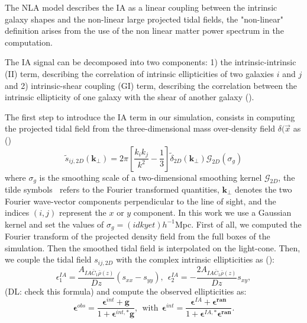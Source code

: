 \documentclass[twocolumn,twocolappendix]{aastex63}
\newcommand{\denise}[1]{{\color{red}DL: #1}}
\begin{document}
The NLA model describes the IA as a linear coupling between the intrinsic galaxy shapes and the non-linear large projected tidal fields, the "non-linear" definition arises from the use of the non linear matter power spectrum in the computation. 

The IA signal can be decomposed into two components: 1) the intrinsic-intrinsic (II) term, describing the correlation of intrinsic ellipticities of two galaxies $i$ and $j$ and 2) intrinsic-shear coupling (GI) term, describing the correlation between the intrinsic ellipticity of one galaxy with the shear of another galaxy (\cite{kilbinger2015cosmology}).

The first step to introduce the IA term in our simulation, consists in computing the projected tidal field from the three-dimensional mass over-density field $\delta(\vec{x}$
as (\cite{harnois2021cosmic})
\begin{equation}
   \tilde{s}_{ij,2D}(\textbf{k}_{\bot})=
   2 \pi 	\left [ \frac{k_ik_j}{k^2}- \frac{1}{3} \right ]
   \tilde{\delta}_{2D}(\textbf{k}_{\bot})
   \mathcal{G}_{2D}(\sigma_g)
\end{equation}
where $\sigma_g$ is the smoothing scale of a two-dimensional smoothing kernel $\mathcal{G}_{2D}$, the tilde symbols $~$ refers to the Fourier transformed quantities, $\textbf{k}_{\bot}$ denotes the two Fourier wave-vector components perpendicular to the line of sight, and the indices $(i,j)$ represent the $x$ or $y$ component.
In this work we use a Gaussian kernel and set the values of $\sigma_g=(idk yet) h^{-1}$Mpc.
First of all, we computed the Fourier transform of the projected density field from the full boxes of the simulation. 
Then the smoothed tidal field is interpolated on the light-cone. 
Then, we couple the tidal field $s_{ij,2D}$ with the complex intrinsic ellipticities as (\cite{harnois2021cosmic}):
\begin{equation}
    \epsilon_{1}^{IA}=\frac{A_{IA\bar{C}_1\bar{\rho}(z)}}{D{z}} (s_{xx}-s_{yy}), \ \ 
      \epsilon_{2}^{IA}=-\frac{2A_{IA\bar{C}_1\bar{\rho}(z)}}{D{z}} s_{xy},
\end{equation}
(\denise{check this formula})
and compute the observed ellipticities as:
\begin{equation}
    \boldsymbol{\epsilon}^{obs}=
    \frac{\boldsymbol{\epsilon}^{int}+\textbf{g}}{1+\boldsymbol{\epsilon}^{int,*}\textbf{g}}, \ \  \text{with}  \ \
    \boldsymbol{\epsilon}^{int}=
    \frac{\boldsymbol{\epsilon}^{
     IA}+\boldsymbol{\epsilon^{ran}}}
     {1+\boldsymbol{\epsilon}^{IA,*}\boldsymbol{\epsilon^{ran}}}.
\end{equation}
\end{document}
